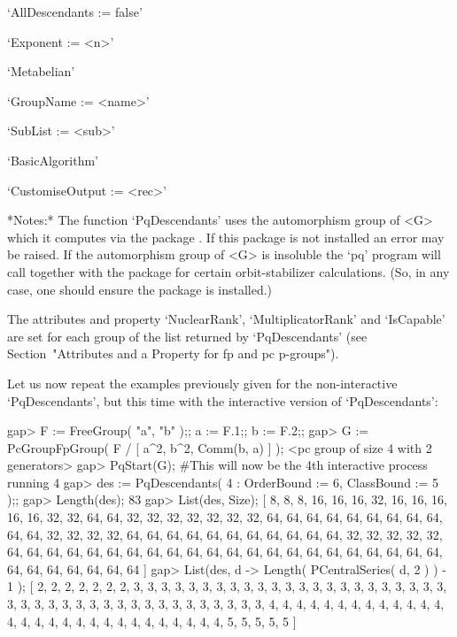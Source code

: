 \item{}`AllDescendants := false'

\item{}`Exponent := <n>'

\item{}`Metabelian'

\item{}`GroupName := <name>'

\item{}`SubList := <sub>'

\item{}`BasicAlgorithm'

\item{}`CustomiseOutput := <rec>'

\endlist

*Notes:*
The function `PqDescendants' uses the automorphism group of <G> which  it
computes via the package {\AutPGrp}. If this package is not installed  an
error may be raised. If the automorphism group of <G>  is  insoluble  the
`pq' program will call {\GAP} together with  the  {\AutPGrp}  package  for
certain orbit-stabilizer calculations.  (So,  in  any  case,  one  should
ensure the {\AutPGrp} package is installed.)

The  attributes  and  property  `NuclearRank',  `MultiplicatorRank'   and
`IsCapable'  are  set  for  each  group   of   the   list   returned   by
`PqDescendants' (see Section~"Attributes and a Property  for  fp  and  pc
p-groups").

Let us now repeat the examples previously given for  the  non-interactive
`PqDescendants',  but  this  time  with  the   interactive   version   of
`PqDescendants':

\beginexample
gap> F := FreeGroup( "a", "b" );; a := F.1;; b := F.2;;
gap> G := PcGroupFpGroup( F / [ a^2, b^2, Comm(b, a) ] );
<pc group of size 4 with 2 generators>
gap> PqStart(G); #This will now be the 4th interactive process running
4
gap> des := PqDescendants( 4 : OrderBound := 6, ClassBound := 5 );;
gap> Length(des);
83
gap> List(des, Size);
[ 8, 8, 8, 16, 16, 16, 32, 16, 16, 16, 16, 16, 32, 32, 64, 64, 32, 32, 32, 
  32, 32, 32, 32, 64, 64, 64, 64, 64, 64, 64, 64, 64, 64, 64, 32, 32, 32, 32, 
  64, 64, 64, 64, 64, 64, 64, 64, 64, 64, 64, 32, 32, 32, 32, 32, 64, 64, 64, 
  64, 64, 64, 64, 64, 64, 64, 64, 64, 64, 64, 64, 64, 64, 64, 64, 64, 64, 64, 
  64, 64, 64, 64, 64, 64, 64 ]
gap> List(des, d -> Length( PCentralSeries( d, 2 ) ) - 1 );
[ 2, 2, 2, 2, 2, 2, 2, 3, 3, 3, 3, 3, 3, 3, 3, 3, 3, 3, 3, 3, 3, 3, 3, 3, 3, 
  3, 3, 3, 3, 3, 3, 3, 3, 3, 3, 3, 3, 3, 3, 3, 3, 3, 3, 3, 3, 3, 3, 3, 3, 4, 
  4, 4, 4, 4, 4, 4, 4, 4, 4, 4, 4, 4, 4, 4, 4, 4, 4, 4, 4, 4, 4, 4, 4, 4, 4, 
  4, 4, 4, 5, 5, 5, 5, 5 ]
\endexample

